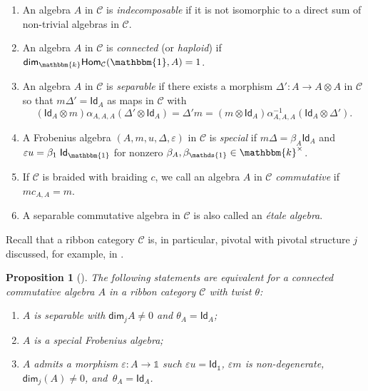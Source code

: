 \documentclass[10pt,a4paper]{amsart}
\numberwithin{equation}{section}
\newtheorem{Proposition}[Theorem]{Proposition}
 { \theoremstyle{definition}
\newtheorem{Definition}[Theorem]{Definition}
\newtheorem{Note}[Theorem]{Note}
\newtheorem{Notation}[Theorem]{Notation}
\newtheorem{Example}[Theorem]{Example}
\newtheorem{Remark}[Theorem]{Remark} }
\newcommand{\Hom}{\mathsf{Hom}}
\newcommand{\ide}{\mathsf{Id}}
\newcommand{\one}{\mathds{1}}
\renewcommand{\dim}{\mathsf{dim}}
\newcommand{\cC}{\mathcal{C}}
\begin{document}
\begin{Definition}\quad
\begin{enumerate}\itemsep=0pt
 \item[(a)] An algebra $A$ in $\cC$ is \textit{indecomposable} if it is not isomorphic to a direct sum of non-trivial algebras in $\cC$.
 \item[(b)] An algebra $A$ in $\cC$ is \textit{connected} (or \textit{haploid}) if
 $\dim_{\mathbbm{k}}\Hom_{\mathcal C} ( \mathbbm{1}, A ) = 1$.
 \item[(c)] An algebra $A$ in $\cC$ is \textit{separable} if there exists a morphism $\Delta' \colon A \to A \otimes A$ in $\cC$ so that $m \Delta' = \ide_A$ as maps in $\cC$ with
 \begin{equation*}
( \ide_A\otimes m ) \alpha_{A, A, A} ( \Delta'\otimes \ide_A ) = \Delta' m = ( m \otimes \ide_A ) \alpha^{-1}_{A, A, A} ( \ide_A\otimes \Delta' ).
 \end{equation*}
 \item[(d)] A Frobenius algebra $ ( A,m,u,\Delta,\varepsilon )$ in $\cC$ is
 \textit{special} if $m \Delta = \beta_A\ide_A$ and $\varepsilon u = \beta_1 \; \ide_\mathbbm{1}$ for nonzero $\beta_A,\beta_\one \in \mathbbm{k}^\times$.
 \item[(e)] If $\cC$ is braided with braiding $c$, we call an algebra $A$ in $\cC$ \emph{commutative} if $m c_{A,A}=m$.
 \item[(f)] A separable commutative algebra in $\cC$ is also called an \emph{\'etale algebra}.
 \end{enumerate}
\end{Definition}

Recall that a ribbon category $\cC$ is, in particular, pivotal with pivotal structure $j$ discussed, for example, in \cite[Section~2.5]{LW3}.

\begin{Proposition}[{\cite[Proposition 3.12]{LW3}}] \label{prop:rigidFrobcharacterization}
The following statements are equivalent for a connected commutative algebra $A$ in a ribbon category $\cC$ with twist $\theta$:
\begin{enumerate}\itemsep=0pt
 \item[$(a)$] $A$ is separable with $\dim_j A \neq 0$ and $\theta_A=\ide_A$;
 \item[$(b)$] $A$ is a special Frobenius algebra;
 \item[$(c)$] $A$ admits a morphism $\varepsilon\colon A\to \one$ such $\varepsilon u=\ide_\one$, $\varepsilon m$ is non-degenerate, $\dim_j(A)\neq 0$, and~${\theta_A=\ide_A}$.
\end{enumerate}
\end{Proposition}
\end{document}
